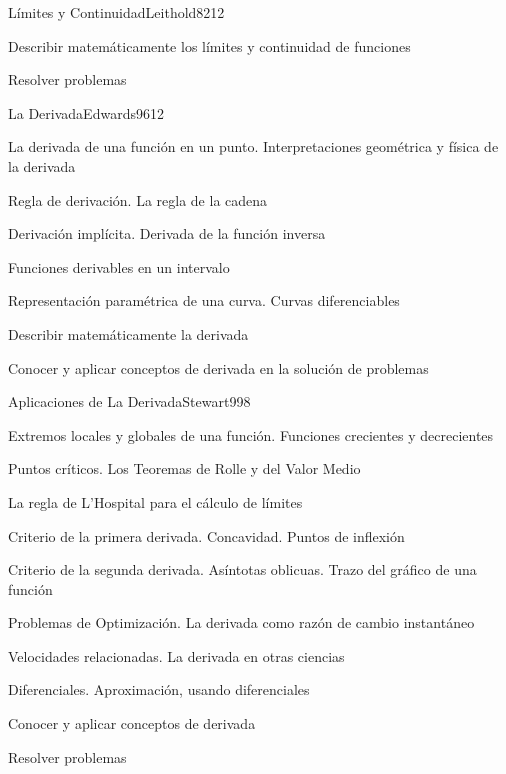 \begin{syllabus}
\begin{unit}{Límites y Continuidad}{Leithold82}{12}
   \begin{unitgoals}
      \item Describir matemáticamente los límites y continuidad de funciones
	\item Resolver problemas
   \end{unitgoals}
\end{unit}

\begin{unit}{La Derivada}{Edwards96}{12}
\begin{topics}
	\item La derivada de una función en un punto. Interpretaciones geométrica y física de la derivada
	\item Regla de derivación. La regla de la cadena
	\item Derivación implícita. Derivada de la función inversa
	\item Funciones derivables en un intervalo
	\item Representación paramétrica de una curva. Curvas diferenciables
\end{topics}

\begin{unitgoals}
	\item Describir matemáticamente la derivada
	\item Conocer y aplicar conceptos de derivada en la solución de problemas
\end{unitgoals}
\end{unit}

\begin{unit}{Aplicaciones de La Derivada}{Stewart99}{8}
\begin{topics}
	\item Extremos locales y globales de una función. Funciones crecientes y decrecientes
	\item Puntos críticos. Los Teoremas de Rolle y del Valor Medio
	\item La regla de L'Hospital para el cálculo de límites
	\item Criterio de la primera derivada. Concavidad. Puntos de inflexión
	\item Criterio de la segunda derivada. Asíntotas oblicuas. Trazo del gráfico de una función
	\item Problemas de Optimización. La derivada como razón de cambio instantáneo
	\item Velocidades relacionadas. La derivada en otras ciencias
	\item Diferenciales. Aproximación, usando diferenciales
\end{topics}

\begin{unitgoals}
	\item Conocer y aplicar conceptos de derivada
	\item Resolver problemas
\end{unitgoals}
\end{unit}

\begin{coursebibliography}
\end{coursebibliography}
\end{syllabus}


